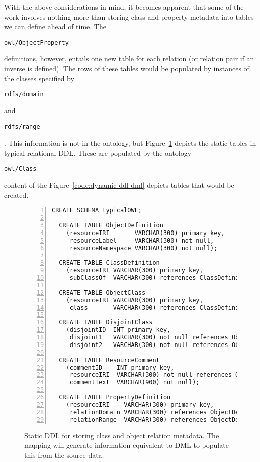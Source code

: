 \documentclass[9pt,letterpaper]{article}
\newcommand{\stt}[1]{\begin{footnotesize}\texttt{#1}\end{footnotesize}}
\begin{document}
%
With the above considerations in mind, it becomes apparent that some of the work involves nothing more than storing class and property metadata into tables we can define ahead of time.
The \stt{owl/ObjectProperty} definitions, however, entails one new table for each relation (or relation pair if an inverse is defined).
The rows of these tables would be populated by instances of the classes specified by \stt{rdfs/domain} and \stt{rdfs/range}.
This information is not in the ontology, but Figure~\ref{code:static-ddl} depicts the static tables in typical relational DDL.
These are populated by the ontology \stt{owl/Class} content of the
Figure~\ref{code:dynamic-ddl-dml} depicts tables that would be created.

\begin{figure}[H]
  \caption{Static DDL for storing class and object relation metadata.
  The mapping will generate information equivalent to DML to populate this from the source data.}
  \label{code:static-ddl}
\begin{lstlisting}[numberstyle=\scriptsize,basicstyle=\ttfamily\scriptsize,numbers=left,stepnumber=1,breaklines=true]
  CREATE SCHEMA typicalOWL;

  CREATE TABLE ObjectDefinition
    (resourceIRI       VARCHAR(300) primary key,
     resourceLabel     VARCHAR(300) not null,
     resourceNamespace VARCHAR(300) not null);

  CREATE TABLE ClassDefinition
    (resourceIRI VARCHAR(300) primary key,
     subClassOf  VARCHAR(300) references ClassDefinition);

  CREATE TABLE ObjectClass
    (resourceIRI VARCHAR(300) primary key,
     class       VARCHAR(300) references ClassDefinition);

  CREATE TABLE DisjointClass
    (disjointID  INT primary key,
     disjoint1   VARCHAR(300) not null references ObjectDefinition,
     disjoint2   VARCHAR(300) not null references ObjectDefinition);

  CREATE TABLE ResourceComment
    (commentID    INT primary key,
     resourceIRI  VARCHAR(300) not null references ObjectDefinition,
     commentText  VARCHAR(900) not null);

  CREATE TABLE PropertyDefinition
    (resourceIRI    VARCHAR(300) primary key,
     relationDomain VARCHAR(300) references ObjectDefinition,
     relationRange  VARCHAR(300) references ObjectDefinition);
\end{lstlisting}
\end{figure}
\end{document}
